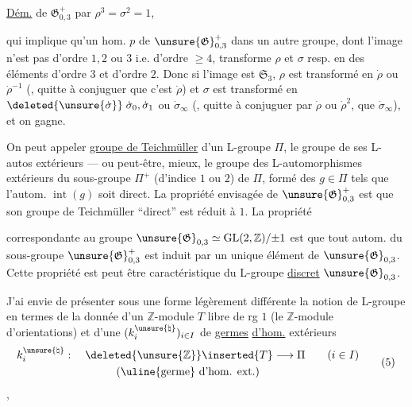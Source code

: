 \uline{Dém.} 
de $\mathfrak{G}_{0,3}^{+}$ par $\rho^3=\sigma^2=1$,

qui implique qu'un hom. $p$ de $\unsure{\mathfrak G}_{0,3}^{+}$ dans un autre groupe, dont l'image n'est pas d'ordre $1,2$ ou $3$ i.e. d'ordre $\geq 4$, transforme $\rho$ et $\sigma$ resp. en des éléments d'ordre $3$ et d'ordre $2$. Donc si l'image est $\mathfrak S_3$, $\rho$ est transformé en $\dot\rho$ ou $\dot\rho^{-1}$ (, quitte à conjuguer  que c'est $\dot\rho$) et $\sigma$ est transformé en $\deleted{\unsure{\dot\sigma}}\;\dot\sigma_0,\dot\sigma_1$ ou $\dot\sigma_\infty$ (, quitte à conjuguer par $\dot\rho$ ou $\dot\rho^2$, que  $\dot\sigma_\infty$), et on gagne.

On peut appeler \uline{groupe de Teichmüller} d'un L-groupe $\Pi$, le groupe de ses L-autos extérieurs --- ou peut-être, mieux, le groupe des L-automorphismes extérieurs du sous-groupe $\Pi^+$ (d'indice $1$ ou $2$) de $\Pi$, formé des $g\in\Pi$ tels que l'autom. $\operatorname{int}(g)$ soit direct. La propriété envisagée de $\unsure{\mathfrak G}_{0,3}^{+}$ est que son groupe de Teichmüller ``direct'' est réduit à $1$. La propriété

correspondante au groupe $\unsure{\mathfrak G}_{0,3}\simeq\operatorname{GL}(2,\mathbb Z)/{\pm1}$ est que tout  autom. du sous-groupe $\unsure{\mathfrak G}_{0,3}^{+}$ est induit par un unique élément de $\unsure{\mathfrak G}_{0,3}$. Cette propriété est peut être caractéristique du L-groupe \uline{discret} $\unsure{\mathfrak G}_{0,3}$.


J'ai envie de présenter sous une forme légèrement différente la notion de L-groupe\inserted{ $\Pi$,} en termes de la donnée d'un $\mathbb Z$-module $T$ libre de rg $1$ (le $\mathbb Z$-module d'orientations) et d'une   $(k_i^{\unsure{\natural}})_{i\in I}$ de \uline{germes} \uline{d'hom.} extérieurs
\[
\begin{gathered}
k_i^{\unsure{\natural}}:\quad \deleted{\unsure{\mathbb Z}}\inserted{T}\longrightarrow\Pi
\qquad (i\in I)\\
(\text{\uline{germe} d'hom. ext.})
\end{gathered}
\tag{5}
\]
,

